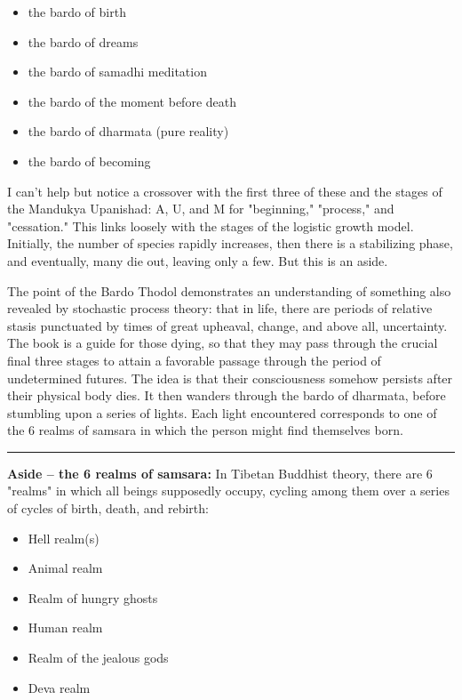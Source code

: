 \begin{itemize} \item the bardo of birth \item the bardo of dreams \item the bardo of samadhi meditation \item the bardo of the moment before death \item the bardo of dharmata (pure reality) \item the bardo of becoming \end{itemize}

I can't help but notice a crossover with the first three of these and the stages of the Mandukya Upanishad: A, U, and M for "beginning," "process," and "cessation." This links loosely with the stages of the logistic growth model. Initially, the number of species rapidly increases, then there is a stabilizing phase, and eventually, many die out, leaving only a few. But this is an aside.

The point of the Bardo Thodol demonstrates an understanding of something also revealed by stochastic process theory: that in life, there are periods of relative stasis punctuated by times of great upheaval, change, and above all, uncertainty. The book is a guide for those dying, so that they may pass through the crucial final three stages to attain a favorable passage through the period of undetermined futures. The idea is that their consciousness somehow persists after their physical body dies. It then wanders through the bardo of dharmata, before stumbling upon a series of lights. Each light encountered corresponds to one of the 6 realms of samsara in which the person might find themselves born.

\vspace{5pt} \hrule \vspace{5pt}

\noindent \textbf{Aside -- the 6 realms of samsara: } In Tibetan Buddhist theory, there are 6 "realms" in which all beings supposedly occupy, cycling among them over a series of cycles of birth, death, and rebirth:

\begin{itemize} \item Hell realm(s) \item Animal realm \item Realm of hungry ghosts \item Human realm \item Realm of the jealous gods \item Deva realm \end{itemize}


